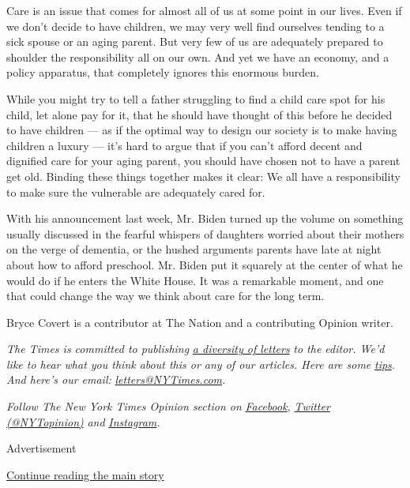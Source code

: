 Care is an issue that comes for almost all of us at some point in our
lives. Even if we don't decide to have children, we may very well find
ourselves tending to a sick spouse or an aging parent. But very few of
us are adequately prepared to shoulder the responsibility all on our
own. And yet we have an economy, and a policy apparatus, that completely
ignores this enormous burden.

While you might try to tell a father struggling to find a child care
spot for his child, let alone pay for it, that he should have thought of
this before he decided to have children --- as if the optimal way to
design our society is to make having children a luxury --- it's hard to
argue that if you can't afford decent and dignified care for your aging
parent, you should have chosen not to have a parent get old. Binding
these things together makes it clear: We all have a responsibility to
make sure the vulnerable are adequately cared for.

With his announcement last week, Mr. Biden turned up the volume on
something usually discussed in the fearful whispers of daughters worried
about their mothers on the verge of dementia, or the hushed arguments
parents have late at night about how to afford preschool. Mr. Biden put
it squarely at the center of what he would do if he enters the White
House. It was a remarkable moment, and one that could change the way we
think about care for the long term.

Bryce Covert is a contributor at The Nation and a contributing Opinion
writer.

\emph{The Times is committed to publishing}
\href{https://www.nytimes3xbfgragh.onion/2019/01/31/opinion/letters/letters-to-editor-new-york-times-women.html}{\emph{a
diversity of letters}} \emph{to the editor. We'd like to hear what you
think about this or any of our articles. Here are some}
\href{https://help.nytimes3xbfgragh.onion/hc/en-us/articles/115014925288-How-to-submit-a-letter-to-the-editor}{\emph{tips}}\emph{.
And here's our email:}
\href{mailto:letters@NYTimes.com}{\emph{letters@NYTimes.com}}\emph{.}

\emph{Follow The New York Times Opinion section on}
\href{https://www.facebookcorewwwi.onion/nytopinion}{\emph{Facebook}}\emph{,}
\href{http://twitter.com/NYTOpinion}{\emph{Twitter (@NYTopinion)}}
\emph{and}
\href{https://www.instagram.com/nytopinion/}{\emph{Instagram}}\emph{.}

Advertisement

\protect\hyperlink{after-bottom}{Continue reading the main story}

